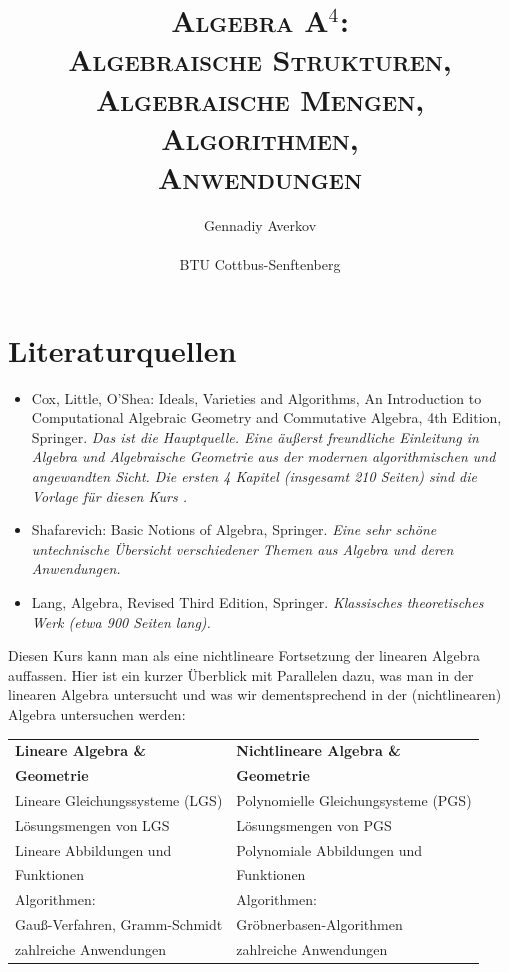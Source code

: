 \documentclass[11pt]{article}
\title{\textsc{Algebra A${}^4$: 
		\\ Algebraische Strukturen, 
		\\ Algebraische Mengen, 
		\\ Algorithmen, 
		\\ Anwendungen}}
\author{Gennadiy Averkov
\\
\\ BTU Cottbus-Senftenberg}
\numberwithin{equation}{section}
\begin{document}
\maketitle


\clearpage 

\tableofcontents

\clearpage

\section*{Literaturquellen}

\begin{itemize}
	\item Cox, Little, O'Shea: Ideals, Varieties and Algorithms, An Introduction to Computational Algebraic Geometry and Commutative Algebra, 4th Edition, Springer. \emph{Das ist die Hauptquelle.  Eine äußerst freundliche Einleitung in Algebra und Algebraische Geometrie aus der modernen algorithmischen und angewandten Sicht. Die ersten 4 Kapitel (insgesamt 210 Seiten) sind die Vorlage für diesen Kurs . }
	\item Shafarevich: Basic Notions of Algebra, Springer. \emph{Eine sehr schöne untechnische Übersicht verschiedener Themen aus Algebra und deren Anwendungen.}
	\item Lang, Algebra, Revised Third Edition, Springer.  \emph{Klassisches theoretisches Werk (etwa 900 Seiten lang).} 
\end{itemize} 

\clearpage 

Diesen Kurs kann man als eine nichtlineare Fortsetzung der linearen Algebra auffassen. Hier ist ein kurzer Überblick mit Parallelen dazu, was man in der linearen Algebra untersucht und was wir dementsprechend in der (nichtlinearen) Algebra untersuchen werden: 

\begin{center} 
\begin{tabular}{l|l}
	\textbf{Lineare Algebra \& } & \textbf{Nichtlineare Algebra \& }
	\\  \textbf{Geometrie} & \textbf{Geometrie}
	\\ \hline\hline Lineare Gleichungssysteme (LGS) & Polynomielle Gleichungsysteme (PGS)
	\\ \hline Lösungsmengen von LGS & Lösungsmengen von PGS
	\\ \hline Lineare Abbildungen  und & Polynomiale Abbildungen und 
	\\ Funktionen & Funktionen 
	\\ \hline Algorithmen:  & Algorithmen: 
	\\ Gauß-Verfahren, Gramm-Schmidt & Gröbnerbasen-Algorithmen 
	\\ \hline 
	zahlreiche Anwendungen & zahlreiche Anwendungen 
\end{tabular}  
\end{center} 
\end{document}
